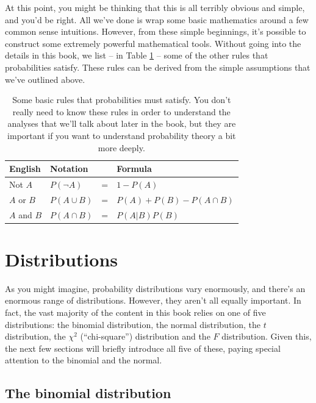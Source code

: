 \documentclass[
]{book}
\theoremstyle{definition}
\theoremstyle{definition}
\theoremstyle{definition}
\theoremstyle{definition}
\theoremstyle{remark}
\begin{document}
At this point, you might be thinking that this is all terribly obvious and simple, and you'd be right. All we've done is wrap some basic mathematics around a few common sense intuitions. However, from these simple beginnings, it's possible to construct some extremely powerful mathematical tools. Without going into the details in this book, we list -- in Table \ref{tab:probrules} -- some of the other rules that probabilities satisfy. These rules can be derived from the simple assumptions that we've outlined above.

\begin{table}[!h]

\caption{\label{tab:probrules}Some basic rules that probabilities must satisfy. You don't really need to know these rules in order to understand the analyses that we'll talk about later in the book, but they are important if you want to understand probability theory a bit more deeply.}
\centering
\begin{tabular}[t]{llll}
\toprule
English & Notation &  & Formula\\
\midrule
Not $A$ & $P(\neg A)$ & = & $1-P(A)$\\
$A$ or $B$ & $P(A \cup B)$ & = & $P(A) + P(B) - P(A \cap B)$\\
$A$ and $B$ & $P(A \cap B)$ & = & $P(A|B) P(B)$\\
\bottomrule
\end{tabular}
\end{table}

\hypertarget{distributions}{%
\section{Distributions}\label{distributions}}

As you might imagine, probability distributions vary enormously, and there's an enormous range of distributions. However, they aren't all equally important. In fact, the vast majority of the content in this book relies on one of five distributions: the binomial distribution, the normal distribution, the \(t\) distribution, the \(\chi^2\) (``chi-square'') distribution and the \(F\) distribution. Given this, the next few sections will briefly introduce all five of these, paying special attention to the binomial and the normal.

\hypertarget{binomial}{%
\subsection{The binomial distribution}\label{binomial}}
\end{document}
